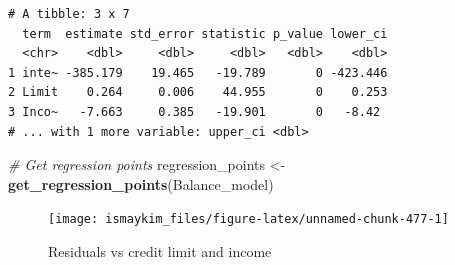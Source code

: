 \documentclass[12pt, krantz2,]{krantz}
\makeatletter
\newenvironment{Shaded}{\begin{snugshade}}{\end{snugshade}}
\newcommand{\CommentTok}[1]{\textcolor[rgb]{0.37,0.37,0.37}{\textit{#1}}}
\newcommand{\DataTypeTok}[1]{\textcolor[rgb]{0.27,0.27,0.27}{#1}}
\newcommand{\KeywordTok}[1]{\textcolor[rgb]{0.27,0.27,0.27}{\textbf{#1}}}
\newcommand{\NormalTok}[1]{#1}
\newcommand{\OperatorTok}[1]{\textcolor[rgb]{0.43,0.43,0.43}{\textbf{#1}}}
\newcommand{\StringTok}[1]{\textcolor[rgb]{0.5,0.5,0.5}{#1}}
\newenvironment{kframe}{%
\medskip{}
\setlength{\fboxsep}{.8em}
 \def\at@end@of@kframe{}%
 \ifinner\ifhmode%
  \def\at@end@of@kframe{\end{minipage}}%
  \begin{minipage}{\columnwidth}%
 \fi\fi%
 \def\FrameCommand##1{\hskip\@totalleftmargin \hskip-\fboxsep
 \colorbox{shadecolor}{##1}\hskip-\fboxsep
     \hskip-\linewidth \hskip-\@totalleftmargin \hskip\columnwidth}%
 \MakeFramed {\advance\hsize-\width
   \@totalleftmargin\z@ \linewidth\hsize
   \@setminipage}}%
 {\par\unskip\endMakeFramed%
 \at@end@of@kframe}
\renewenvironment{Shaded}{\begin{kframe}}{\end{kframe}}
\makeatother
\begin{document}
\begin{verbatim}
# A tibble: 3 x 7
  term  estimate std_error statistic p_value lower_ci
  <chr>    <dbl>     <dbl>     <dbl>   <dbl>    <dbl>
1 inte~ -385.179    19.465   -19.789       0 -423.446
2 Limit    0.264     0.006    44.955       0    0.253
3 Inco~   -7.663     0.385   -19.901       0   -8.42 
# ... with 1 more variable: upper_ci <dbl>
\end{verbatim}

\begin{Shaded}
\begin{Highlighting}[]
\CommentTok{# Get regression points}
\NormalTok{regression_points <-}\StringTok{ }\KeywordTok{get_regression_points}\NormalTok{(Balance_model)}
\end{Highlighting}
\end{Shaded}

\begin{Shaded}
\end{Shaded}

\begin{figure}

{\centering \texttt{[image: ismaykim\_files/figure-latex/unnamed-chunk-477-1]} 

}

\caption{Residuals vs credit limit and income}\label{fig:unnamed-chunk-477}
\end{figure}
\end{document}
